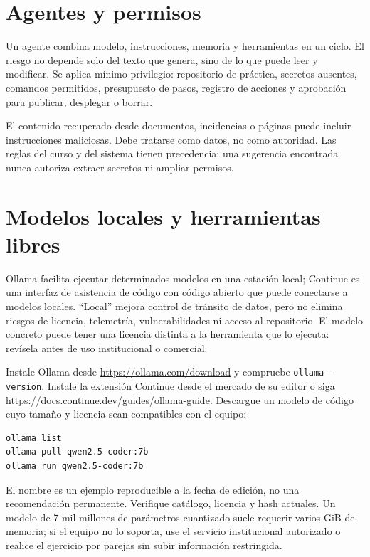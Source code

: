 \section{Agentes y permisos}

Un agente combina modelo, instrucciones, memoria y herramientas en un ciclo. El riesgo no depende solo del texto que genera, sino de lo que puede leer y modificar. Se aplica mínimo privilegio: repositorio de práctica, secretos ausentes, comandos permitidos, presupuesto de pasos, registro de acciones y aprobación para publicar, desplegar o borrar.

El contenido recuperado desde documentos, incidencias o páginas puede incluir instrucciones maliciosas. Debe tratarse como datos, no como autoridad. Las reglas del curso y del sistema tienen precedencia; una sugerencia encontrada nunca autoriza extraer secretos ni ampliar permisos.

\section{Modelos locales y herramientas libres}

Ollama facilita ejecutar determinados modelos en una estación local; Continue es una interfaz de asistencia de código con código abierto que puede conectarse a modelos locales. ``Local'' mejora control de tránsito de datos, pero no elimina riesgos de licencia, telemetría, vulnerabilidades ni acceso al repositorio. El modelo concreto puede tener una licencia distinta a la herramienta que lo ejecuta: revísela antes de uso institucional o comercial.

\begin{instalacion}
Instale Ollama desde \url{https://ollama.com/download} y compruebe \texttt{ollama --version}. Instale la extensión Continue desde el mercado de su editor o siga \url{https://docs.continue.dev/guides/ollama-guide}. Descargue un modelo de código cuyo tamaño y licencia sean compatibles con el equipo:
\begin{lstlisting}[language=bash]
ollama list
ollama pull qwen2.5-coder:7b
ollama run qwen2.5-coder:7b
\end{lstlisting}
El nombre es un ejemplo reproducible a la fecha de edición, no una recomendación permanente. Verifique catálogo, licencia y hash actuales. Un modelo de 7 mil millones de parámetros cuantizado suele requerir varios GiB de memoria; si el equipo no lo soporta, use el servicio institucional autorizado o realice el ejercicio por parejas sin subir información restringida.
\end{instalacion}

